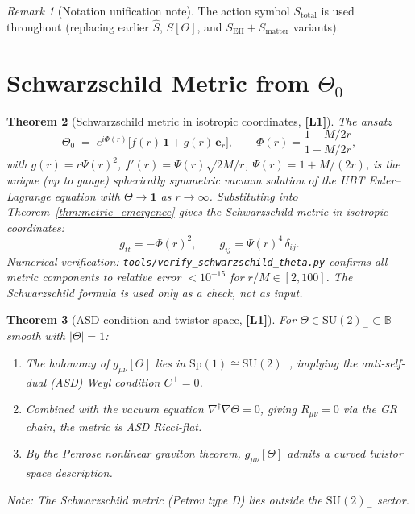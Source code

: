 \documentclass[12pt,a4paper]{article}
\newtheorem{theorem}{Theorem}[section]
\theoremstyle{definition}
\theoremstyle{remark}
\newtheorem{remark}[theorem]{Remark}
\newcommand{\Lone}{\textbf{[L1]}}
\newcommand{\BB}{\mathbb{B}}               %
\newcommand{\Stot}{S_{\mathrm{total}}}     %
\begin{document}
\begin{remark}[Notation unification note]
The action symbol $\Stot$ is used throughout (replacing earlier $\hat{S}$,
$S[\Theta]$, and $S_\mathrm{EH} + S_\mathrm{matter}$ variants).
\end{remark}

\section{Schwarzschild Metric from $\Theta_0$}
\label{sec:schwarzschild}

\begin{theorem}[Schwarzschild metric in isotropic coordinates, \Lone]
\label{thm:schwarzschild}
The ansatz
\[
  \Theta_0 \;=\; e^{i\Phi(r)}\bigl[f(r)\,\mathbf{1} + g(r)\,\boldsymbol{e}_r\bigr],
  \qquad \Phi(r) = \frac{1 - M/2r}{1 + M/2r},
\]
with $g(r) = r\Psi(r)^2$, $f'(r) = \Psi(r)\sqrt{2M/r}$, $\Psi(r) = 1 + M/(2r)$,
is the unique (up to gauge) spherically symmetric vacuum solution of the UBT
Euler--Lagrange equation with $\Theta \to \mathbf{1}$ as $r\to\infty$.
Substituting into Theorem~\ref{thm:metric_emergence} gives the Schwarzschild metric
in isotropic coordinates:
\[
  g_{tt} = -\Phi(r)^2, \qquad
  g_{ij} = \Psi(r)^4\,\delta_{ij}.
\]
\emph{Numerical verification}: \texttt{tools/verify\_schwarzschild\_theta.py}
confirms all metric components to relative error $< 10^{-15}$ for $r/M \in [2,100]$.
The Schwarzschild formula is used only as a check, not as input.
\end{theorem}

\begin{theorem}[ASD condition and twistor space, \Lone]
\label{thm:asd}
For $\Theta \in \mathrm{SU}(2)_- \subset \BB$ smooth with $|\Theta|=1$:
\begin{enumerate}
  \item The holonomy of $g_{\mu\nu}[\Theta]$ lies in
        $\mathrm{Sp}(1)\cong\mathrm{SU}(2)_-$,
        implying the anti-self-dual (ASD) Weyl condition $C^+ = 0$.
  \item Combined with the vacuum equation $\nabla^\dagger\nabla\Theta = 0$,
        giving $R_{\mu\nu} = 0$ via the GR chain, the metric is ASD Ricci-flat.
  \item By the Penrose nonlinear graviton theorem, $g_{\mu\nu}[\Theta]$ admits
        a curved twistor space description.
\end{enumerate}
Note: The Schwarzschild metric (Petrov type D) lies \emph{outside} the
$\mathrm{SU}(2)_-$ sector.
\end{theorem}
\end{document}
